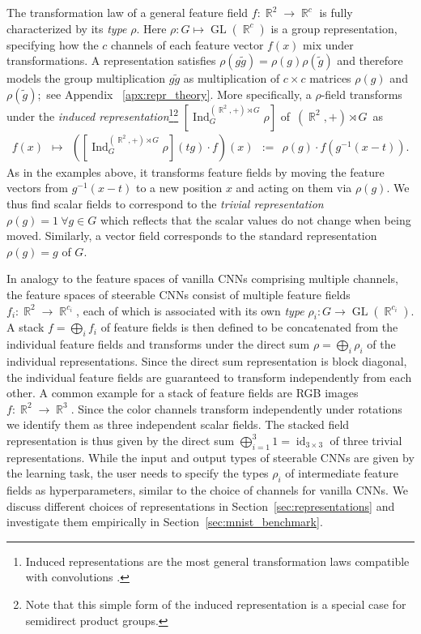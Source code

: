 \documentclass{article}
\newcommand{\apx}{Appendix\xspace
}
\DeclareMathOperator*{\R}{\mathbb{R}}
\newcommand{\GL}[1]{\ensuremath{\operatorname{GL}(#1)}}
\begin{document}
The transformation law of a general feature field $f:\R^2\to\R^c$ is fully characterized by its \emph{type} $\rho$.
Here $\rho:G\mapsto\GL{\R^c}$ is a group representation, specifying how the $c$ channels of each feature vector $f(x)$ mix under transformations.
A representation satisfies $\rho(g\tilde{g})=\rho(g)\rho(\tilde{g})$ and therefore models the group multiplication $g\tilde{g}$ as multiplication of $c\times c$ matrices $\rho(g)$ and $\rho(\tilde{g})$;~see \apx~\ref{apx:repr_theory}.
More specifically, a $\rho$-field transforms under the \emph{induced representation}\footnote{
    Induced representations are the most general transformation laws compatible with convolutions \cite{Cohen2018-IIR,generaltheory}.
}\footnote{
    Note that this simple form of the induced representation is a special case for semidirect product groups.
}
${\left[\operatorname{Ind}_G^{(\R^2,+)\rtimes G}\!\rho\right]}$ of~${(\R^2,+)\rtimes G}$~as
\vspace*{-.2ex}
\vspace*{-.5ex}
\begin{align}\label{eq:induced_rep_translations}
    f(x)\ \ \mapsto\ \ 
    \left(\left[\operatorname{Ind}_G^{(\R^2,+)\rtimes G}\rho\right]\!\!(tg)\cdot f\right)\! (x)
    \ \ :=\ \ \rho(g)\cdot f\left(g^{-1}(x-t)\right).
\end{align}
As in the examples above, it transforms feature fields by moving the feature vectors from $g^{-1}(x-t)$ to a new position $x$ and acting on them via $\rho(g)$.
We thus find scalar fields to correspond to the \emph{trivial representation} $\rho(g)=1\ \forall g\in G$ which reflects that the scalar values do not change when being moved.
Similarly, a vector field corresponds to the standard representation $\rho(g)=g$ of $G$.

In analogy to the feature spaces of vanilla CNNs comprising multiple channels, the feature spaces of steerable CNNs consist of multiple feature fields $f_i\!:\R^2\to\R^{c_i}$, each of which is associated with its own \emph{type} $\rho_i\!:G\to\GL{\R^{c_i}}$.
A stack $f=\bigoplus_i f_i$ of feature fields is then defined to be concatenated from the individual feature fields and transforms under the direct sum $\rho=\bigoplus_i\rho_i$ of the individual representations.
Since the direct sum representation is block diagonal, the individual feature fields are guaranteed to transform independently from each other.
A common example for a stack of feature fields are RGB images $f\!\!:\R^2\!\to\!\R^3$.
Since the color channels transform independently under rotations we identify them as three independent scalar fields.
The stacked field representation is thus given by the direct sum $\bigoplus_{i=1}^3 1=\operatorname{id}_{3\times3}$ of three trivial representations.
While the input and output types of steerable CNNs are given by the learning task, the user needs to specify the types $\rho_i$ of intermediate feature fields as hyperparameters, similar to the choice of channels for vanilla CNNs.
We discuss different choices of representations in Section~\ref{sec:representations} and investigate them empirically in Section~\ref{sec:mnist_benchmark}. 	
\end{document}
